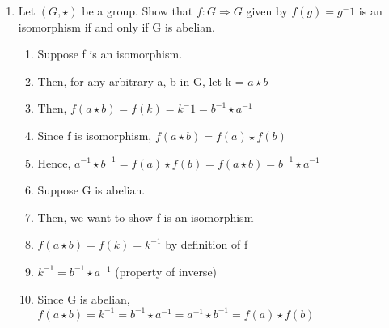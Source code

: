 \documentclass{article}
\begin{document}
\begin{enumerate}
\item Let $ (G, \star) $ be a group. Show that $f: G \Rightarrow G $ given by
$ f(g) = g^-1 $ is an isomorphism if and only if G is abelian.

\begin{enumerate}

\item Suppose f is an isomorphism.
\item Then, for any arbitrary a, b in G, let k = $ a \star b $
\item Then, $f(a \star b) = f(k) = k^-1 = b^{-1} \star a^{-1} $
\item Since f is isomorphism, $f(a \star b) = f(a) \star f(b) $
\item Hence, $ a^{-1} \star b^{-1} = f(a) \star f(b) = f(a \star b) = b^{-1} \star a^{-1} $

\item Suppose G is abelian.
\item Then, we want to show f is an isomorphism
\item $f(a \star b) = f(k) = k^{-1} $ by definition of f
\item $ k^{-1} = b^{-1} \star a^{-1} $ (property of inverse)
\item Since G is abelian, $f(a \star b) = k^{-1} = b^{-1} \star a^{-1} = a^{-1}
\star b^{-1} = f(a) \star f(b) $
\end{enumerate}

\end{enumerate}
\end{document}
